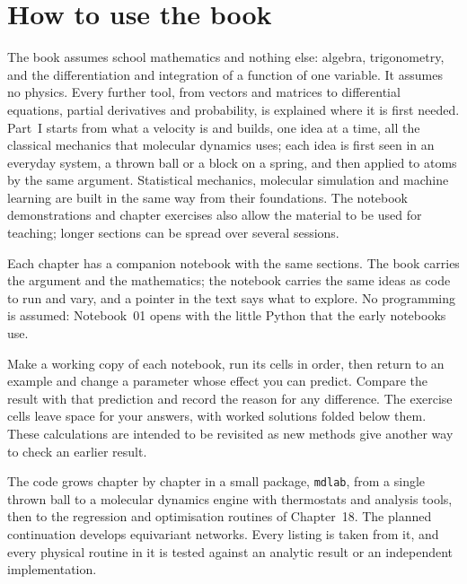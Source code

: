 \section{How to use the book}
\label{sec:or-use}

The book assumes school mathematics and nothing else: algebra,
trigonometry, and the differentiation and integration of a function of one
variable. It assumes no physics. Every further tool, from vectors and
matrices to differential equations, partial derivatives and probability,
is explained where it is first needed. Part~I
starts from what a velocity is and builds, one idea at a time, all the
classical mechanics that molecular dynamics uses; each idea is first seen
in an everyday system, a thrown ball or a block on a spring, and then
applied to atoms by the same argument. Statistical mechanics, molecular
simulation and machine learning are built in the same way from their
foundations. The notebook demonstrations and chapter exercises also allow
the material to be used for teaching; longer sections can be spread over
several sessions.

Each chapter has a companion notebook with the same sections. The book
carries the argument and the mathematics; the notebook carries the same
ideas as code to run and vary, and a pointer in the text says what to
explore. No programming is assumed: Notebook~01 opens with the little
Python that the early notebooks use.

Make a working copy of each notebook, run its cells in order, then return
to an example and change a parameter whose effect you can predict. Compare
the result with that prediction and record the reason for any difference.
The exercise cells leave space for your answers, with worked solutions
folded below them. These calculations are intended to be revisited as new
methods give another way to check an earlier result.


The code grows chapter by chapter in a small package, \texttt{mdlab}, from
a single thrown ball to a molecular dynamics engine with thermostats
and analysis tools, then to the regression and optimisation routines of
Chapter~18. The planned continuation develops equivariant networks.
Every listing is taken from it, and every physical routine in it is tested
against an analytic result or an independent implementation.


